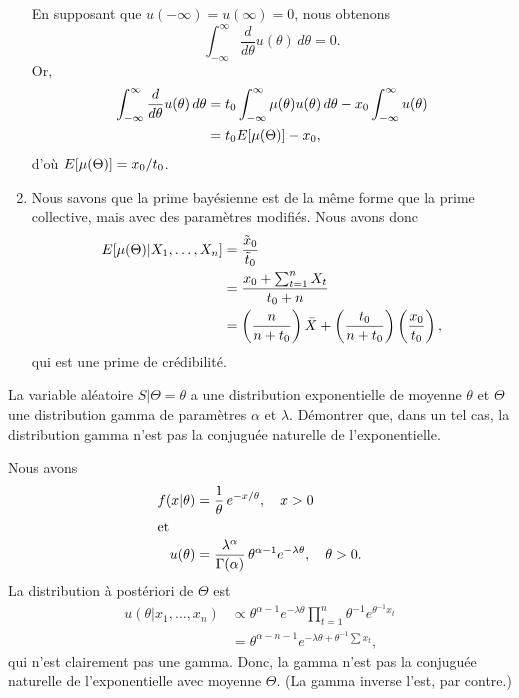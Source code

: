 \begin{exercice}
\begin{sol}
\begin{enumerate}
      En supposant que $u(-\infty) = u(\infty) = 0$, nous obtenons
      \begin{equation*}
        \int_{-\infty}^\infty \frac{d}{d\theta} u(\theta)\, d\theta = 0.
      \end{equation*}
      Or,
      \begin{align*}
        \int_{-\infty}^\infty \frac{d}{d\theta} u(\theta)\, d\theta
        &= t_0 \int_{-\infty}^\infty \mu(\theta) u(\theta)\, d\theta -
        x_0 \int_{-\infty}^\infty u(\theta) \\
        &= t_0 E [ \mu(\Theta) ] - x_0,
      \end{align*}
      d'où $E [ \mu(\Theta) ] = x_0/t_0$.
    \item Nous savons que la prime bayésienne est de la même forme que
      la prime collective, mais avec des paramètres modifiés. Nous avons
      donc
      \begin{align*}
        E [ \mu(\Theta)|X_1, \dots, X_n ]
        &= \frac{\tilde{x}_0}{\tilde{t}_0} \\
        &= \frac{x_0 + \sum_{t=1}^n X_t}{t_0 + n} \\
        &= \left(\frac{n}{n + t_0}\right) \bar{X} + \left(\frac{t_0}{n + t_0}\right)
        \left(\frac{x_0}{t_0}\right),
      \end{align*}
      qui est une prime de crédibilité.
    \end{enumerate}
  \end{sol}
\end{exercice}

\begin{exercice}
  La variable aléatoire $S|\Theta = \theta$ a une distribution
  exponentielle de moyenne $\theta$ et $\Theta$ une distribution gamma
  de paramètres $\alpha$ et $\lambda$.  Démontrer que, dans un tel
  cas, la distribution gamma n'est pas la conjuguée naturelle de
  l'exponentielle.
  \begin{sol}
    Nous avons
    \begin{align*}
      f(x|\theta)
      &= \frac{1}{\theta}\, e^{-x/\theta}, \quad x > 0 \\
      \intertext{et}
      u(\theta)
      &= \frac{\lambda^\alpha}{\Gamma(\alpha)}\, \theta^{\alpha-1}
      e^{-\lambda \theta}, \quad \theta > 0.
    \end{align*}
    La distribution à postériori de $\Theta$ est
    \begin{align*}
      u(\theta|x_1, \dots, x_n)
      &\propto \theta^{\alpha-1} e^{-\lambda \theta} \prod_{t=1}^n
      \theta^{-1} e^{\theta^{-1} x_t} \\
      &= \theta^{\alpha - n - 1} e^{-\lambda \theta + \theta^{-1} \sum
        x_t},
    \end{align*}
    qui n'est clairement pas une gamma. Donc, la gamma n'est pas la
    conjuguée naturelle de l'exponentielle avec moyenne $\Theta$. (La
    gamma inverse l'est, par contre.)
  \end{sol}
\end{exercice}

